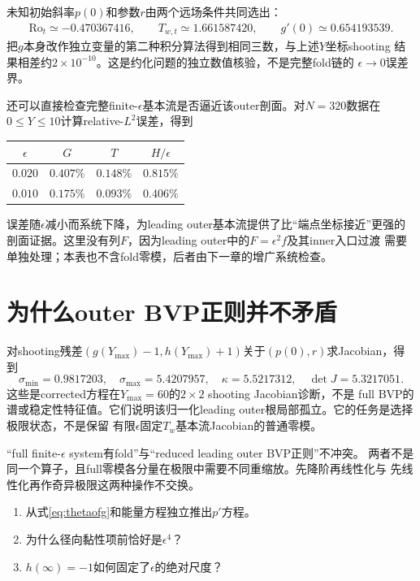 \documentclass[UTF8,zihao=-4,openany]{ctexbook}
\newcommand{\eps}{\epsilon}
\newcommand{\Ro}{\mathrm{Ro}}
\begin{document}
未知初始斜率$p(0)$和参数$r$由两个远场条件共同选出：
\begin{align}
 \boxed{\Ro_t\simeq-0.470367416},\qquad
 \boxed{T_{w,t}\simeq1.661587420},\qquad
 \boxed{g'(0)\simeq0.654193539}.
\end{align}
把$g$本身改作独立变量的第二种积分算法得到相同三数，与上述$Y$坐标shooting
结果相差约$2\times10^{-10}$。这是约化问题的独立数值核验，不是完整fold链的
$\eps\to0$误差界。

还可以直接检查完整finite-$\eps$基本流是否逼近该outer剖面。对$N=320$数据在
$0\le Y\le10$计算relative-$L^2$误差，得到
\begin{center}
\begin{tabular}{cccc}
\toprule
$\eps$ & $G$ & $T$ & $H/\eps$\\
\midrule
$0.020$ & $0.407\%$ & $0.148\%$ & $0.815\%$\\
$0.010$ & $0.175\%$ & $0.093\%$ & $0.406\%$\\
\bottomrule
\end{tabular}
\end{center}
误差随$\eps$减小而系统下降，为leading outer基本流提供了比“端点坐标接近”更强的
剖面证据。这里没有列$F$，因为leading outer中的$F=\eps^2f$及其inner入口过渡
需要单独处理；本表也不含fold零模，后者由下一章的增广系统检查。

\section{为什么outer BVP正则并不矛盾}

对shooting残差$(g(Y_{\max})-1,h(Y_{\max})+1)$关于$(p(0),r)$求Jacobian，得到
\begin{equation}
 \sigma_{\min}=0.9817203,\quad \sigma_{\max}=5.4207957,\quad
 \kappa=5.5217312,\quad \det J=5.3217051.
\end{equation}
这些是corrected方程在$Y_{\max}=60$的$2\times2$ shooting Jacobian诊断，不是
full BVP的谱或稳定性特征值。它们说明该归一化leading outer根局部孤立。它的任务是选择极限状态，不是保留
有限$\eps$固定$T_w$基本流Jacobian的普通零模。

\begin{warningbox}
“full finite-$\eps$ system有fold”与“reduced leading outer BVP正则”不冲突。
两者不是同一个算子，且full零模各分量在极限中需要不同重缩放。先降阶再线性化与
先线性化再作奇异极限这两种操作不交换。
\end{warningbox}

\begin{checkpoint}
\begin{enumerate}
  \item 从式\eqref{eq:thetaofg}和能量方程独立推出$p'$方程。
  \item 为什么径向黏性项前恰好是$\eps^4$？
  \item $h(\infty)=-1$如何固定了$\eps$的绝对尺度？
\end{enumerate}
\end{checkpoint}
\end{document}
